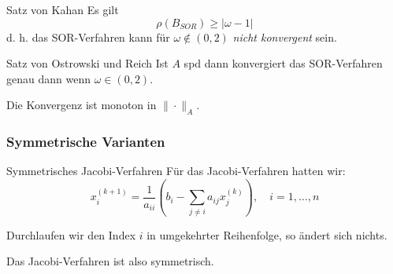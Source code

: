 \begin{defi}{Satz von Kahan}
    Es gilt
    \[
        \rho(B_{SOR}) \geq |\omega - 1|
    \]
    d. h. das SOR-Verfahren kann für $\omega \notin (0, 2)$ \emph{nicht konvergent} sein.
\end{defi}

\begin{defi}{Satz von Ostrowski und Reich}
    Ist $A$ spd dann konvergiert das SOR-Verfahren genau dann wenn $\omega \in (0, 2)$.

    Die Konvergenz ist monoton in $\| \cdot \|_A$.
\end{defi}

\subsubsection{Symmetrische Varianten}

\begin{bonus}{Symmetrisches Jacobi-Verfahren}
    Für das Jacobi-Verfahren hatten wir:
    \[
        x_i^{(k+1)} = \frac{1}{a_{ii}} \left( b_i - \sum_{j \neq i} a_{ij} x_j^{(k)} \right), \quad i = 1, \ldots, n
    \]

    Durchlaufen wir den Index $i$ in umgekehrter Reihenfolge, so ändert sich nichts.

    Das Jacobi-Verfahren ist also symmetrisch.
\end{bonus}

